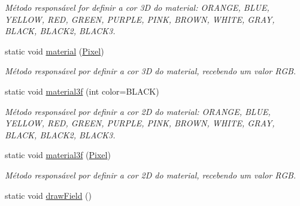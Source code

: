 \begin{DoxyCompactItemize}
\begin{DoxyCompactList}\small\item\em Método responsável for definir a cor 3D do material\+: O\+R\+A\+N\+GE, B\+L\+UE, Y\+E\+L\+L\+OW, R\+ED, G\+R\+E\+EN, P\+U\+R\+P\+LE, P\+I\+NK, B\+R\+O\+WN, W\+H\+I\+TE, G\+R\+AY, B\+L\+A\+CK, B\+L\+A\+C\+K2, B\+L\+A\+C\+K3. \end{DoxyCompactList}\item 
static void \hyperlink{classGraphics_a7fccb7730e87ee29133bc0fa6171059e}{material} (\hyperlink{structcommon_1_1Pixel}{Pixel})
\begin{DoxyCompactList}\small\item\em Método responsável por definir a cor 3D do material, recebendo um valor R\+GB. \end{DoxyCompactList}\item 
static void \hyperlink{classGraphics_ab5d975a404218d57cd494b8897d7b046}{material3f} (int color=B\+L\+A\+CK)
\begin{DoxyCompactList}\small\item\em Método responsável por definir a cor 2D do material\+: O\+R\+A\+N\+GE, B\+L\+UE, Y\+E\+L\+L\+OW, R\+ED, G\+R\+E\+EN, P\+U\+R\+P\+LE, P\+I\+NK, B\+R\+O\+WN, W\+H\+I\+TE, G\+R\+AY, B\+L\+A\+CK, B\+L\+A\+C\+K2, B\+L\+A\+C\+K3. \end{DoxyCompactList}\item 
static void \hyperlink{classGraphics_a23d042e2b5a049bb2369d9a1f6794e2d}{material3f} (\hyperlink{structcommon_1_1Pixel}{Pixel})\hypertarget{classGraphics_a23d042e2b5a049bb2369d9a1f6794e2d}{}\label{classGraphics_a23d042e2b5a049bb2369d9a1f6794e2d}

\begin{DoxyCompactList}\small\item\em Método responsável por definir a cor 2D do material, recebendo um valor R\+GB. \end{DoxyCompactList}\item 
static void \hyperlink{classGraphics_adc5dbcd8d8d999d48dbdf241fde77603}{draw\+Field} ()\hypertarget{classGraphics_adc5dbcd8d8d999d48dbdf241fde77603}{}\label{classGraphics_adc5dbcd8d8d999d48dbdf241fde77603}


\end{DoxyCompactItemize}
